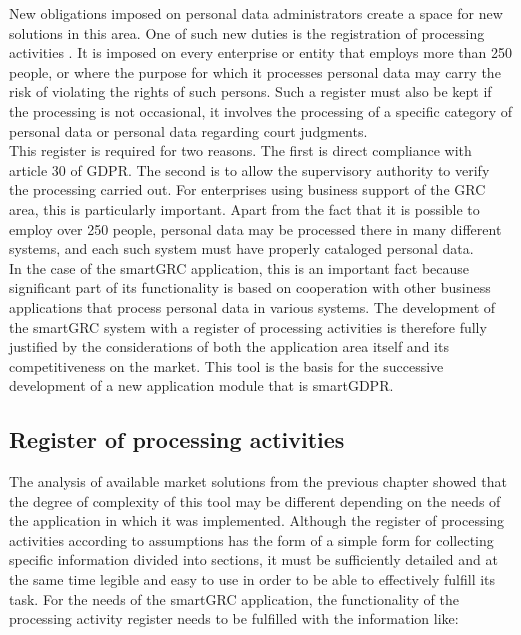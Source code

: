 \documentclass[en, noamssymb]{mgr}
\begin{document}
New obligations imposed on personal data administrators create a space for new solutions in this area. One of such new duties is the registration of processing activities \cite{rodo_art30}. It is imposed on every enterprise or entity that employs more than 250 people, or where the purpose for which it processes personal data may carry the risk of violating the rights of such persons. Such a register must also be kept if the processing is not occasional, it involves the processing of a specific category of personal data or personal data regarding court judgments.\\
\indent This register is required for two reasons. The first is direct compliance with article 30 of GDPR. The second is to allow the supervisory authority to verify the processing carried out. For enterprises using business support of the GRC area, this is particularly important. Apart from the fact that it is possible to employ over 250 people, personal data may be processed there in many different systems, and each such system must have properly cataloged personal data.\\
\indent In the case of the smartGRC application, this is an important fact because significant part of its functionality is based on cooperation with other business applications that process personal data in various systems. The development of the smartGRC system with a register of processing activities is therefore fully justified by the considerations of both the application area itself and its competitiveness on the market. This tool is the basis for the successive development of a new application module that is smartGDPR.
 
\subsection{Register of processing activities}

The analysis of available market solutions from the previous chapter showed that the degree of complexity of this tool may be different depending on the needs of the application in which it was implemented. Although the register of processing activities according to assumptions has the form of a simple form for collecting specific information divided into sections, it must be sufficiently detailed and at the same time legible and easy to use in order to be able to effectively fulfill its task. For the needs of the smartGRC application, the functionality of the processing activity register needs to be fulfilled with the information like:
\end{document}
